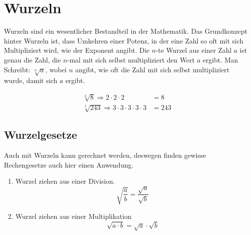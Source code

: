 \section{Wurzeln}\label{sec:Wurzeln}
Wurzeln sind ein wesentlicher Bestandteil in der Mathematik. Das Grundkonzept hinter Wurzeln ist, dass Umkehren einer Potenz, in der eine Zahl so oft mit sich Multipliziert wird, wie der Exponent angibt. Die $n$-te Wurzel aus einer Zahl $a$ ist genau die Zahl, die $n$-mal mit sich selbst multipliziert den Wert $a$ ergibt.
Man Schreibt: $\sqrt[n]{a}$, wobei $n$ angibt, wie oft die Zahl mit sich selbst multipliziert wurde, damit sich $a$ ergibt. 

\begin{beispiel}
	\begin{align}
		\sqrt[3]{8} \Rightarrow 2\cdot 2\cdot 2&=8\\
		\sqrt[5]{243} \Rightarrow 3\cdot 3\cdot 3\cdot 3\cdot 3&=243
	\end{align}
\end{beispiel}
\subsection{Wurzelgesetze}\label{sec:Wurzeln/Wurzelgesetzte}
 Auch mit Wurzeln kann gerechnet werden, deswegen finden gewisse Rechengesetze auch hier einen Anwendung.
\begin{enumerate}
	\item Wurzel ziehen aus einer Division. \[\sqrt{\frac{a}{b}}=\frac{\sqrt{a}}{\sqrt{b}}\]	
	\item Wurzel ziehen aus einer Multiplikation \[\sqrt{a\cdot b}=\sqrt{a}\cdot \sqrt{b}\]
\end{enumerate}